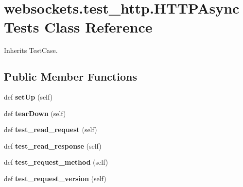 \hypertarget{classwebsockets_1_1test__http_1_1_h_t_t_p_async_tests}{}\section{websockets.\+test\+\_\+http.\+H\+T\+T\+P\+Async\+Tests Class Reference}
\label{classwebsockets_1_1test__http_1_1_h_t_t_p_async_tests}


Inherits Test\+Case.

\subsection*{Public Member Functions}
\begin{DoxyCompactItemize}
\item 
\mbox{\label{classwebsockets_1_1test__http_1_1_h_t_t_p_async_tests_a35f25c3b76842949f9410299e8905fb1}} 
def {\bfseries set\+Up} (self)
\item 
\mbox{\label{classwebsockets_1_1test__http_1_1_h_t_t_p_async_tests_a0b21a6efba2fbda507eeb42a5b880f23}} 
def {\bfseries tear\+Down} (self)
\item 
\mbox{\label{classwebsockets_1_1test__http_1_1_h_t_t_p_async_tests_a50b523dde9ceb5df6545a0e73f049437}} 
def {\bfseries test\+\_\+read\+\_\+request} (self)
\item 
\mbox{\label{classwebsockets_1_1test__http_1_1_h_t_t_p_async_tests_a142f6e8601942a6f36943f0904df7344}} 
def {\bfseries test\+\_\+read\+\_\+response} (self)
\item 
\mbox{\label{classwebsockets_1_1test__http_1_1_h_t_t_p_async_tests_a788b897b4d70228799eeb4f33b8a4310}} 
def {\bfseries test\+\_\+request\+\_\+method} (self)
\item 
\mbox{\label{classwebsockets_1_1test__http_1_1_h_t_t_p_async_tests_a2744f47a8c38143c8ec3ee19b9ab0a93}} 
def {\bfseries test\+\_\+request\+\_\+version} (self)

\end{DoxyCompactItemize}
